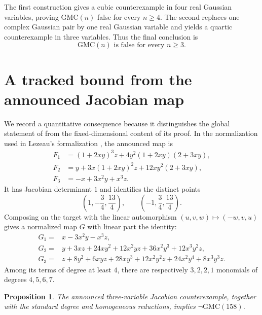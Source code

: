 \documentclass[11pt]{article}
\newcommand{\GMC}{\mathrm{GMC}}
\newtheorem{proposition}[theorem]{Proposition}
\theoremstyle{remark}
\begin{document}
The first construction gives a cubic counterexample in four real Gaussian variables, proving $\GMC(n)$ false for every $n\geq4$.  The second replaces one complex Gaussian pair by one real Gaussian variable and yields a quartic counterexample in three variables.  Thus the final conclusion is
\[
  \boxed{\GMC(n)\text{ is false for every }n\geq3.}
\]

\section{A tracked bound from the announced Jacobian map}\label{sec:jc-bound}

We record a quantitative consequence because it distinguishes the global statement of \cite[Theorem~1.6]{DVEZ} from the fixed-dimensional content of its proof.  In the normalization used in Lezeau's formalization \cite{Lezeau}, the announced map is
\[
\begin{aligned}
 F_1&=(1+2xy)^3z+4y^2(1+2xy)(2+3xy),\\
 F_2&=y+3x(1+2xy)^2z+12xy^2(2+3xy),\\
 F_3&=-x+3x^2y+x^3z.
\end{aligned}
\]
It has Jacobian determinant $1$ and identifies the distinct points
\[
  \left(1,-\frac34,\frac{13}{4}\right),\qquad
  \left(-1,\frac34,\frac{13}{4}\right).
\]
Composing on the target with the linear automorphism $(u,v,w)\mapsto(-w,v,u)$ gives a normalized map $G$ with linear part the identity:
\[
\begin{aligned}
G_1={}&x-3x^2y-x^3z,\\
G_2={}&y+3xz+24xy^2+12x^2yz+36x^2y^3+12x^3y^2z,\\
G_3={}&z+8y^2+6xyz+28xy^3+12x^2y^2z+24x^2y^4+8x^3y^3z.
\end{aligned}
\]
Among its terms of degree at least $4$, there are respectively $3,2,2,1$ monomials of degrees $4,5,6,7$.

\begin{proposition}\label{prop:route-bound}
The announced three-variable Jacobian counterexample, together with the standard degree and homogeneous reductions, implies $\neg\GMC(158)$.
\end{proposition}
\end{document}
